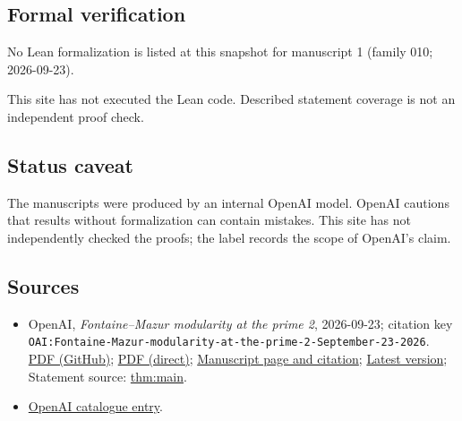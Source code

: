 \documentclass[11pt]{article}
\begin{document}
\subsection{Formal verification}
No Lean formalization is listed at this snapshot for manuscript 1 (family 010; 2026-09-23).

This site has not executed the Lean code. Described statement coverage is not an independent proof check.

\subsection{Status caveat}
The manuscripts were produced by an internal OpenAI model. OpenAI cautions that results without formalization can contain mistakes. This site has not independently checked the proofs; the label records the scope of OpenAI's claim.

\subsection{Sources}
\begin{itemize}
\item OpenAI, \emph{Fontaine–Mazur modularity at the prime 2}, 2026-09-23; citation key \texttt{OAI:Fontaine-Mazur-modularity-at-the-prime-2-September-23-2026}. \href{https://github.com/openai/math/blob/adc7f1241b42e322a6451854ab7e4b4c146bf78a/preprints/Fontaine-Mazur-modularity-at-the-prime-2-September-23-2026/paper.pdf}{PDF (GitHub)}; \href{https://github.com/openai/math/raw/adc7f1241b42e322a6451854ab7e4b4c146bf78a/preprints/Fontaine-Mazur-modularity-at-the-prime-2-September-23-2026/paper.pdf}{PDF (direct)}; \href{https://github.com/openai/math/blob/adc7f1241b42e322a6451854ab7e4b4c146bf78a/preprints/Fontaine-Mazur-modularity-at-the-prime-2-September-23-2026/README.md}{Manuscript page and citation}; \href{https://github.com/openai/math/blob/main/preprints/Fontaine-Mazur-modularity-at-the-prime-2-September-23-2026/paper.pdf}{Latest version}; Statement source: \href{https://github.com/openai/math/blob/adc7f1241b42e322a6451854ab7e4b4c146bf78a/preprints/Fontaine-Mazur-modularity-at-the-prime-2-September-23-2026/build/sections/introduction.tex\#L20}{thm:main}.
\item \href{https://github.com/openai/math/blob/adc7f1241b42e322a6451854ab7e4b4c146bf78a/CONTENTS.md}{OpenAI catalogue entry}.
\end{itemize}
\end{document}
